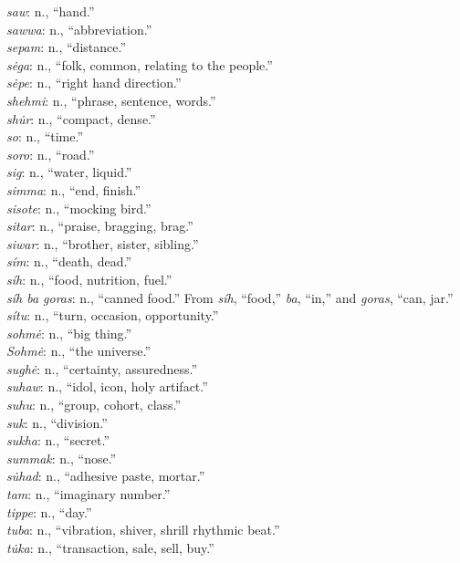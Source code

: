 \documentclass{article}[10pt]
\begin{document}
\begin{multicols}{3}
\emph{saw}: n., ``hand.''\\
\emph{sawwa}: n., ``abbreviation.''\\
\emph{sepam}: n., ``distance.''\\
\emph{s\.{e}ga}: n., ``folk, common, relating to the people.''\\
\emph{s\.{e}pe}: n., ``right hand direction.''\\
\emph{shehmi}: n., ``phrase, sentence, words.''\\
\emph{sh\.{u}r}: n., ``compact, dense.''\\
\emph{so}: n., ``time.''\\
\emph{soro}: n., ``road.''\\
\emph{sig}: n., ``water, liquid.''\\
\emph{simma}: n., ``end, finish.''\\
\emph{sisote}: n., ``mocking bird.''\\
\emph{sitar}: n., ``praise, bragging, brag.''\\
\emph{siwar}: n., ``brother, sister, sibling.''\\
\emph{s\'{i}m}: n., ``death, dead.''\\
\emph{s\'{i}h}: n., ``food, nutrition, fuel.''\\
\emph{s\'{i}h ba goras}: n., ``canned food.'' From \emph{s\'{i}h}, ``food,'' \emph{ba}, ``in,'' and \emph{goras}, ``can, jar.''\\
\emph{s\'{i}tu}: n., ``turn, occasion, opportunity.''\\
\emph{sohm\.{e}}: n., ``big thing.''\\
\emph{Sohm\.{e}}: n., ``the universe.''\\
\emph{sugh\.{e}}: n., ``certainty, assuredness.''\\
\emph{suhaw}: n., ``idol, icon, holy artifact.''\\
\emph{suhu}: n., ``group, cohort, class.''\\
\emph{suk}: n., ``division.''\\
\emph{sukha}: n., ``secret.''\\
\emph{summak}: n., ``nose.''\\
\emph{s\.{u}had}: n., ``adhesive paste, mortar.''\\
\emph{tam}: n., ``imaginary number.''\\
\emph{tippe}: n., ``day.''\\
\emph{tuba}: n., ``vibration, shiver, shrill rhythmic beat.''\\
\emph{t\.{u}ka}: n., ``transaction, sale, sell, buy.''\\

\end{multicols}
\end{document}
